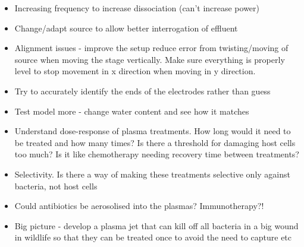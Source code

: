 \documentclass[11pt, oneside]{article}   	%
\begin{document}
\begin{itemize}
\item Increasing frequency to increase dissociation (can't increase power)
\item Change/adapt source to allow better interrogation of effluent
\item Alignment issues - improve the setup reduce error from twisting/moving of source when moving the stage vertically. Make sure everything is properly level to stop movement in x direction when moving in y direction.
\item Try to accurately identify the ends of the electrodes rather than guess
\item Test model more - change water content and see how it matches

\item Understand dose-response of plasma treatments. How long would it need to be treated and how many times? Is there a threshold for damaging host cells too much? Is it like chemotherapy needing recovery time between treatments? 
\item Selectivity. Is there a way of making these treatments selective only against bacteria, not host cells
\item Could antibiotics be aerosolised into the plasmas? Immunotherapy?!
\item Big picture - develop a plasma jet that can kill off all bacteria in a big wound in wildlife so that they can be treated once to avoid the need to capture etc

\end{itemize}



\end{document}
